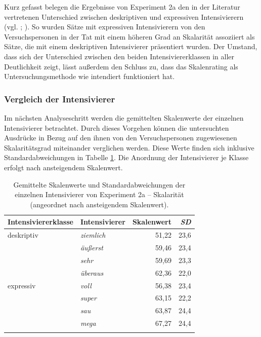 Kurz gefasst belegen die Ergebnisse von {Experiment 2a} den in der Literatur vertretenen Unterschied zwischen deskriptiven und expressiven Intensivierern (vgl. \citealt[22]{Paradis.1997}; {\citealt[133]{Gutzmann.2019a}}). So wurden Sätze mit expressiven Intensivierern von den Versuchspersonen in der Tat mit einem höheren Grad an Skalarität assoziiert als Sätze, die mit einem deskriptiven Intensivierer präsentiert wurden. Der Umstand, dass sich der Unterschied zwischen den beiden Intensiviererklassen in aller Deutlichkeit zeigt, lässt außerdem den Schluss zu, dass das Skalenrating als Untersuchungsmethode wie intendiert funktioniert hat.



\subsubsection{Vergleich der Intensivierer}\label{LiGe}


\noindent Im nächsten Analyseschritt werden die gemittelten Skalenwerte der einzelnen Intensivierer betrachtet. Durch dieses Vorgehen können die untersuchten Ausdrücke in Bezug auf den ihnen von den Versuchspersonen zugewiesenen Skalaritätsgrad miteinander verglichen werden. Diese Werte finden sich inklusive Standardabweichungen in Tabelle \ref{Skalenwert3}. Die Anordnung der Intensivierer je Klasse erfolgt nach ansteigendem Skalenwert.

%
\begin{table}
\begin{tabularx}{.8\textwidth}{Xlrr}
\lsptoprule
Intensiviererklasse & Intensivierer  & Skalenwert &  \textit{SD}\\
\midrule
\rowcolor[gray]{.90}
deskriptiv & \textit{ziemlich} & 51,22 & 23,6\\
           & \textit{äußerst}  & 59,46 & 23,4\\
 \rowcolor[gray]{.90}
           & \textit{sehr}     & 59,69 & 23,3\\
           & \textit{überaus}  & 62,36 & 22,0\\
 \rowcolor[gray]{.90}
expressiv  & \textit{voll}     & 56,38 & 23,4\\
           & \textit{super}    & 63,15 & 22,2\\
 \rowcolor[gray]{.90}
           & \textit{sau}      & 63,87 & 24,4\\
           & \textit{mega}     & 67,27 & 24,4\\
\lspbottomrule

\end{tabularx}
\caption[Gemittelte Skalenwerte der einzelnen Intensivierer von Experiment 2a]{Gemittelte Skalenwerte und Standardabweichungen der einzelnen Intensivierer von Experiment 2a -- Skalarität (angeordnet nach ansteigendem Skalenwert).}
\label{Skalenwert3}
\end{table}


